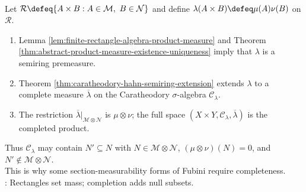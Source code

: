 \begin{perspective} \label{per:rectangle-premeasure-completed-product} \\
Let $\mathcal{R}\defeq\{A\times B:A\in\mathcal M,\ B\in\mathcal N\}$ and define $\lambda(A\times B)\defeq\mu(A)\nu(B)$ on $\mathcal R$.
\begin{enumerate}[label=(\roman*)]
\setlength{\itemsep}{0pt}
\item Lemma \ref{lem:finite-rectangle-algebra-product-measure} and Theorem \ref{thm:abstract-product-measure-existence-uniqueness} imply that $\lambda$ is a semiring premeasure.
\item Theorem \ref{thm:caratheodory-hahn-semiring-extension} extends $\lambda$ to a complete measure $\overline{\lambda}$ on the Caratheodory $\sigma$-algebra $\mathcal C_\lambda$.
\item The restriction $\overline{\lambda}|_{\mathcal M\otimes\mathcal N}$ is $\mu\otimes\nu$; the full space $(X\times Y,\mathcal C_\lambda,\overline{\lambda})$ is the completed product.
\end{enumerate}
Thus $\mathcal C_\lambda$ may contain $N'\subseteq N$ with $N\in\mathcal M\otimes\mathcal N$, $(\mu\otimes\nu)(N)=0$, and $N'\notin\mathcal M\otimes\mathcal N$.\\
This is why some section-measurability forms of Fubini require completeness.\\
: Rectangles set mass; completion adds null subsets.
\end{perspective}
